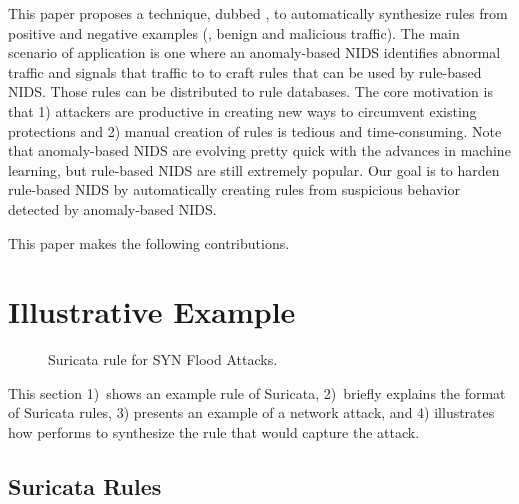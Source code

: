 \documentclass[conference]{IEEEtran}
\begin{document}

This paper proposes a technique, dubbed \tname{}, to automatically
synthesize rules from positive and negative examples (\ie{}, benign
and malicious traffic). The main scenario of application is one where
an anomaly-based NIDS identifies abnormal traffic and signals that
traffic to \tname{} to craft rules that can be used by rule-based
NIDS. Those rules can be distributed to rule databases. The core
motivation is that 1) attackers are productive in creating new ways to
circumvent existing protections and 2) manual creation of rules is
tedious and time-consuming.  Note that anomaly-based NIDS are evolving
pretty quick with the advances in machine learning, but rule-based
NIDS are still extremely popular. Our goal is to harden rule-based
NIDS by automatically creating rules from suspicious behavior detected
by anomaly-based NIDS.



This paper makes the following contributions. 

\section{Illustrative Example}
\label{sec:suri-metas-coverage}

\begin{figure}[t]
  
  \caption{Suricata rule for SYN Flood Attacks.}
  \label{fig:synflood-example}
\end{figure}

This section 1)~shows an example rule of Suricata, 2)~briefly explains
the format of Suricata rules, 3) presents an example of a network
attack, and 4) illustrates how \tname{} performs to synthesize the
rule that would capture the attack.

\subsection{Suricata Rules}
\label{sec:example-suricata-rules}
\end{document}
